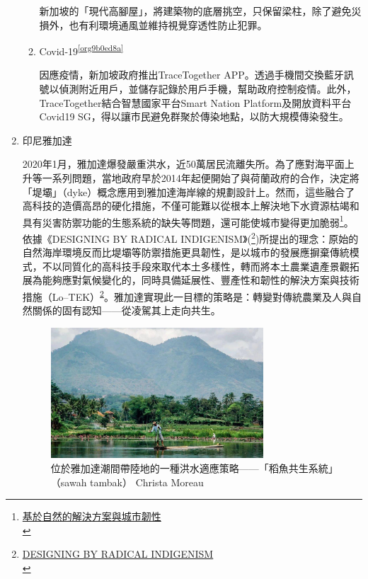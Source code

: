 \documentclass[a4paper,12pt]{article}
\begin{document}
\begin{enumerate}
\begin{enumerate}
新加坡的「現代高腳屋」，將建築物的底層挑空，只保留梁柱，除了避免災損外，也有利環境通風並維持視覺穿透性防止犯罪。\\

\item Covid-19\textsuperscript{\ref{org9b0ed8a}}
\label{sec:org455704d}

因應疫情，新加坡政府推出TraceTogether APP。透過手機間交換藍牙訊號以偵測附近用戶，並儲存記錄於用戶手機，幫助政府控制疫情。此外，TraceTogether結合智慧國家平台Smart Nation Platform及開放資料平台Covid19 SG，得以讓市民避免群聚於傳染地點，以防大規模傳染發生。\\
\end{enumerate}

\item 印尼雅加達
\label{sec:org6b29db8}

2020年1月，雅加達爆發嚴重洪水，近50萬居民流離失所。為了應對海平面上升等一系列問題，當地政府早於2014年起便開始了與荷蘭政府的合作，決定將「堤壩」（dyke）概念應用到雅加達海岸線的規劃設計上。然而，這些融合了高科技的造價高昂的硬化措施，不僅可能難以從根本上解決地下水資源枯竭和具有災害防禦功能的生態系統的缺失等問題，還可能使城市變得更加脆弱\footnote{\href{https://twgreatdaily.com/OR8rtHMBLq-Ct6CZ8wQ5.html}{基於自然的解決方案與城市韌性}\\\label{org5d24e36}}。\\

依據《DESIGNING BY RADICAL INDIGENISM》(\footnote{\href{http://113.31.19.9/Qikan/Article/Detail?id=7102610394\&from=Qikan\_Search\_Index}{DESIGNING BY RADICAL INDIGENISM}\\\label{org7a42975}})所提出的理念：原始的自然海岸環境反而比堤壩等防禦措施更具韌性，是以城市的發展應摒棄傳統模式，不以同質化的高科技手段來取代本土多樣性，轉而將本土農業遺產景觀拓展為能夠應對氣候變化的，同時具備延展性、豐產性和韌性的解決方案與技術措施（Lo–TEK）\textsuperscript{\ref{org7a42975}}。雅加達實現此一目標的策略是：轉變對傳統農業及人與自然關係的固有認知——從凌駕其上走向共生。\\
\begin{figure}[htbp]
\centering
\includegraphics[width=300]{images/oOKotHMBeElxlkka9awL.jpg}
\caption{\label{fig:yd-1}位於雅加達潮間帶陸地的一種洪水適應策略——「稻魚共生系統」（sawah tambak） Christa Moreau}
\end{figure}


\end{enumerate}
\end{document}

